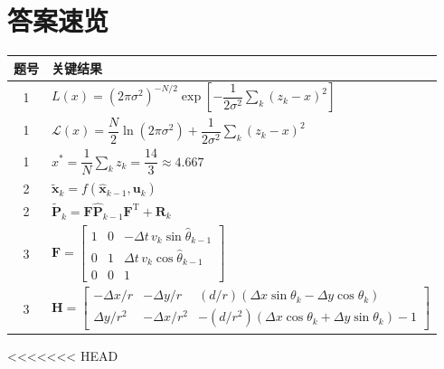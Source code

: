 \documentclass[12pt]{article}
\begin{document}
\section*{答案速览}

\begin{table}[h]
\centering
\renewcommand{\arraystretch}{1.5}
\begin{tabular}{cl}
\toprule
\textbf{题号} & \textbf{关键结果}\\
\midrule
1 & $L(x)=(2\pi\sigma^2)^{-N/2}\exp\!\left[-\dfrac{1}{2\sigma^2}\sum_k(z_k-x)^2\right]$ \\
1 & $\mathcal{L}(x)=\dfrac{N}{2}\ln(2\pi\sigma^2)+\dfrac{1}{2\sigma^2}\sum_k(z_k-x)^2$ \\
1 & $x^{*}=\dfrac{1}{N}\sum_k z_k=\dfrac{14}{3}\approx 4.667$ \\
2 & $\tilde{\mathbf{x}}_k=f(\hat{\mathbf{x}}_{k-1},\mathbf{u}_k)$ \\
2 & $\tilde{\mathbf{P}}_k=\mathbf{F}\hat{\mathbf{P}}_{k-1}\mathbf{F}^\mathrm{T}+\mathbf{R}_k$ \\
3 & $\mathbf{F}=\begin{bmatrix}1&0&-\Delta t\,v_k\sin\hat{\theta}_{k-1}\\0&1&\Delta t\,v_k\cos\hat{\theta}_{k-1}\\0&0&1\end{bmatrix}$ \\
3 & $\mathbf{H}=\begin{bmatrix}-\Delta x/r & -\Delta y/r & (d/r)(\Delta x\sin\theta_k-\Delta y\cos\theta_k)\\ \Delta y/r^2 & -\Delta x/r^2 & -(d/r^2)(\Delta x\cos\theta_k+\Delta y\sin\theta_k)-1\end{bmatrix}$ \\
\bottomrule
\end{tabular}
\end{table}

<<<<<<< HEAD
\end{document}

